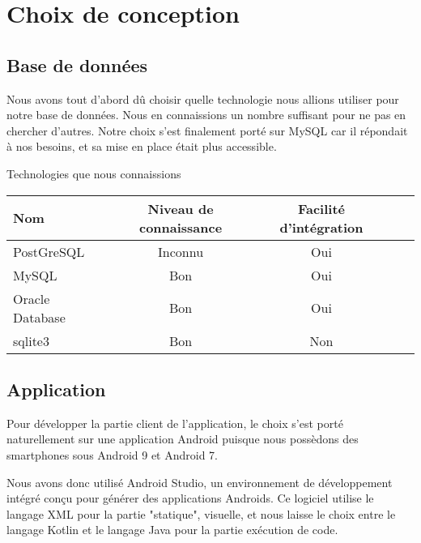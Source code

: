 \section{Choix de conception}

\subsection{Base de données}
Nous avons tout d'abord dû choisir quelle technologie nous allions utiliser pour notre base de données.
Nous en connaissions un nombre suffisant pour ne pas en chercher d'autres. Notre choix s'est finalement porté sur MySQL car il répondait à nos besoins, et sa mise en place était plus accessible.
\par
\begin{center}
    Technologies que nous connaissions
    \par
    \begin{tabular}{|l|c|c|c|c|}
        \hline
        Nom & Niveau de connaissance & Facilité d'intégration \\
        \hline
        PostGreSQL & Inconnu & Oui\\
        \hline
        MySQL & Bon & Oui \\
        \hline
        Oracle Database & Bon & Oui\\
        \hline
        sqlite3 & Bon & Non\\
        \hline
    \end{tabular}
\end{center}


\subsection{Application}
Pour développer la partie client de l'application, le choix s'est porté naturellement sur une application Android puisque nous possèdons des
smartphones sous Android 9 et Android 7. 
\par
Nous avons donc utilisé Android Studio, un environnement de développement intégré conçu pour générer
des applications Androids. Ce logiciel utilise le langage XML pour la partie "statique", visuelle, et nous laisse le choix entre le langage
Kotlin et le langage Java pour la partie exécution de code.

